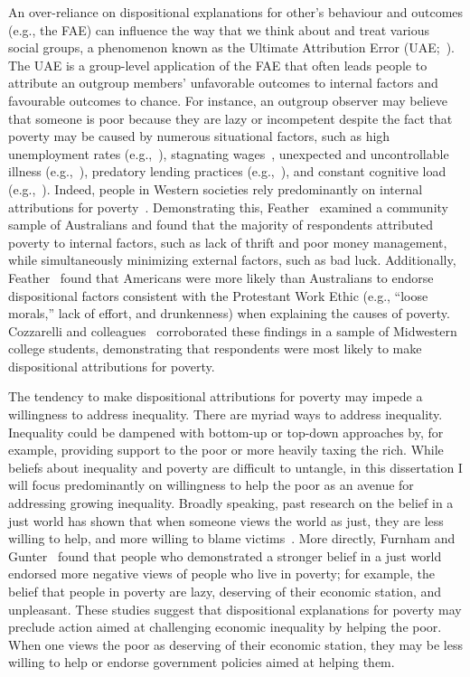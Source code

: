 \documentclass{sfuthesis}
\begin{document}
An over-reliance on dispositional explanations for other’s behaviour and outcomes (e.g., the FAE) can influence the way that we think about and treat various social groups, a phenomenon known as the Ultimate Attribution Error (UAE;~\cite{pettigrew79}). The UAE is a group-level application of the FAE that often leads people to attribute an outgroup members’ unfavorable outcomes to internal factors and favourable outcomes to chance. For instance, an outgroup observer may believe that someone is poor because they are lazy or incompetent despite the fact that poverty may be caused by numerous situational factors, such as high unemployment rates (e.g.,~\cite{krohn76}), stagnating wages~\cite{desilver14}, unexpected and uncontrollable illness (e.g.,~\cite{grau88}), predatory lending practices (e.g.,~\cite{engel02}), and constant cognitive load (e.g.,~\cite{mani13}). Indeed, people in Western societies rely predominantly on internal attributions for poverty~\cite{cozzarelli01, feather74}. Demonstrating this, Feather~\cite{feather74} examined a community sample of Australians and found that the majority of respondents attributed poverty to internal factors, such as lack of thrift and poor money management, while simultaneously minimizing external factors, such as bad luck. Additionally, Feather~\cite{feather74} found that Americans were more likely than Australians to endorse dispositional factors consistent with the Protestant Work Ethic (e.g., “loose morals,” lack of effort, and drunkenness) when explaining the causes of poverty. Cozzarelli and colleagues~\cite{cozzarelli01} corroborated these findings in a sample of Midwestern college students, demonstrating that respondents were most likely to make dispositional attributions for poverty.

The tendency to make dispositional attributions for poverty may impede a willingness to address inequality. There are myriad ways to address inequality. Inequality could be dampened with bottom-up or top-down approaches by, for example, providing support to the poor or more heavily taxing the rich. While beliefs about inequality and poverty are difficult to untangle, in this dissertation I will focus predominantly on willingness to help the poor as an avenue for addressing growing inequality. Broadly speaking, past research on the belief in a just world has shown that when someone views the world as just, they are less willing to help, and more willing to blame victims~\cite{correia01}. More directly, Furnham and Gunter~\cite{furnham84} found that people who demonstrated a stronger belief in a just world endorsed more negative views of people who live in poverty; for example, the belief that people in poverty are lazy, deserving of their economic station, and unpleasant. These studies suggest that dispositional explanations for poverty may preclude action aimed at challenging economic inequality by helping the poor. When one views the poor as deserving of their economic station, they may be less willing to help or endorse government policies aimed at helping them.
\end{document}
